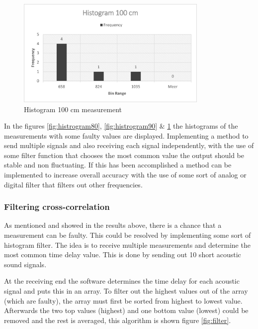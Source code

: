 \documentclass[10pt,a4paper]{article}
\begin{document}
\begin{figure}[H]
   \centering
   \includegraphics[width=0.82\textwidth]{histogram100.pdf}
   \caption{Histogram 100 cm measurement}
   \label{fig:histrogram100}
\end{figure}

In the figures \ref{fig:histrogram80}, \ref{fig:histrogram90} $\&$ \ref{fig:histrogram100} the histograms of the measurements with some faulty values are displayed. Implementing a method to send multiple signals and also receiving each signal independently, with the use of some filter function that chooses the most common value the output should be stable and non fluctuating. If this has been accomplished a method can be implemented to increase overall accuracy with the use of some sort of analog or digital filter that filters out other frequencies.

\subsubsection{Filtering cross-correlation}
As mentioned and showed in the results above, there is a chance that a measurement can be faulty. This could be resolved by implementing some sort of histogram filter. The idea is to receive multiple measurements and determine the most common time delay value. This is done by sending out 10 short acoustic sound signals.

At the receiving end the software determines the time delay for each acoustic signal and puts this in an array. To filter out the highest values out of the array (which are faulty), the array must first be sorted from highest to lowest value. Afterwards the two top values (highest) and one bottom value (lowest) could be removed and the rest is averaged, this algorithm is shown figure \ref{fig:filter}.
\end{document}
